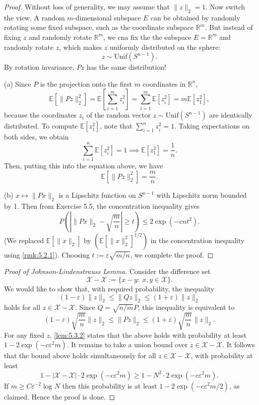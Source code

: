 \begin{proof}
Without loss of generality, we may assume that $\lVert z \rVert_{2} = 1$. Now switch the view. A random 
$m$-dimensional subspace $E$ can be obtained by randomly rotating some fixed subspace, such as the coordinate 
subspace $\mathbb{R}^m$. But instead of fixing $z$ and randomly rotate $\mathbb{R}^m$, we cna fix the the 
subspace $E = \mathbb{R}^m$ and randomly rotate $z$, which makes $z$ uniformly distributed on the sphere:
\[ z \sim \mathrm{Unif}(S^{n - 1}). \]
By rotation invariance, $Pz$ has the same distribution!

(a) Since $P$ is the projection onto the first $m$ coordinates in $\mathbb{R}^n$, 
\[ \mathbb{E}\left[ \lVert Pz \rVert_{2}^2 \right] = \mathbb{E}\left[ \sum_{i = 1}^{m} z_i^2 \right] 
= \sum_{i = 1}^{m}\mathbb{E}\left[ z_i^2 \right] = m \mathbb{E}\left[ z_1^2 \right], \]
because the coordinates $z_i$ of the random vector $z \sim \mathrm{Unif}(S^{n - 1})$ are identically 
distributed. To compute $\mathbb{E}\left[ z_1^2 \right]$, note that $\sum_{i = 1}^{n}z_i^2 = 1$. Taking 
expectations on both sides, we obtain 
\[ \sum_{i = 1}^{n}\mathbb{E}\left[ z_i^2 \right] = 1 \implies \mathbb{E}\left[ z_1^2 \right] = \frac{1}{n}. \]
Then, putting this into the equation above, we have 
\[ \mathbb{E}\left[ \lVert Pz \rVert_{2}^2 \right] = \frac{m}{n}. \]

(b) $x \mapsto \lVert Px \rVert_{2}$ is a Lipschitz function on $S^{n - 1}$ with Lipschitz norm bounded by 1. 
Then from Exercise 5.5, the concentration inequality gives 
\[ P \left( \left| \lVert Px \rVert_{2} - \sqrt{\frac{m}{n}} \right| \geq t \right) 
\leq 2 \exp{(-cnt^2)}. \]
(We replaced $\mathbb{E}\left[ \lVert x \rVert_{2} \right]$ by $(\mathbb{E}\left[ \lVert x \rVert_{2}^2 \right]^
{1/2})$ in the concentration inequality using \cref{rmk:5.2.1}). Choosing $t := \varepsilon \sqrt{m/n}$, we 
complete the proof.
\end{proof}

\begin{proof}[Proof of Johnson-Lindenstrauss Lemma]
Consider the difference set 
\[ \mathcal{X} - \mathcal{X} := \{ x - y: \ x, y \in \mathcal{X} \}. \]
We would like to show that, with required probability, the inequality
\[ (1 - \varepsilon)\lVert z \rVert_{2} \leq \lVert Qz \rVert_{2} \leq (1 + \varepsilon)\lVert z \rVert_{2} \]
holds for all $z \in \mathcal{X} - \mathcal{X}$. Since $Q = \sqrt{n/m}P$, this inequality is equivalent to 
\[ (1 - \varepsilon)\sqrt{\frac{m}{n}}\lVert z \rVert_{2} \leq \lVert Pz \rVert_{2} 
\leq (1 + \varepsilon)\sqrt{\frac{m}{n}}\lVert z \rVert_{2}. \]
For any fixed $z$, \cref{lem:5.3.2} states that the above holds with probability at least $1 - 2 \exp{(-c 
\varepsilon^2 m)}$. It remains to take a union bound over $z \in \mathcal{X} - \mathcal{X}$. It follows that 
the bound above holds simultaneously for all $z \in \mathcal{X} - \mathcal{X}$, with probability at least 
\[ 1 - |\mathcal{X} - \mathcal{X}| \cdot 2 \exp{(-c \varepsilon^2 m)} \geq 1 - N^2 \cdot 
2 \exp{(-c \varepsilon^2 m)}. \]
If $m \geq C \varepsilon^{-2} \log_{}{N}$ then this probability is at least $1 - 2 
\exp{(-c \varepsilon^2 m/2)}$, as claimed. Hence the proof is done.
\end{proof}

